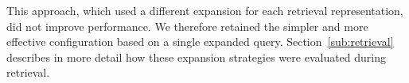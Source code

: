 This approach, which used a different expansion for each retrieval representation, did not improve performance. We therefore retained the simpler and more effective configuration based on a single expanded query. Section~\ref{sub:retrieval} describes in more detail how these expansion strategies were evaluated during retrieval.  




